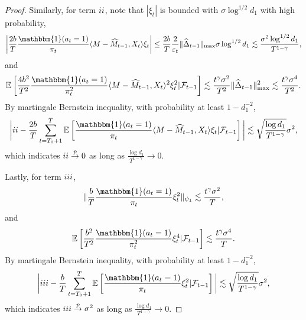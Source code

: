 \documentclass[12pt]{article}
\newcommand{\inp}[2]{\langle #1,#2\rangle}
\def\EE{{\mathbb E}}
\theoremstyle{plain}
\begin{document}
\begin{proof}
    Similarly, for term $\uppercase\expandafter{\romannumeral2}$, note that $|\xi_t|$ is bounded with $\sigma\log^{1/2} d_1$ with high probability, 
    \begin{align*}
        \bigg|\frac{2b}{T} \frac{\mathbbm{1}(a_t=1)}{\pi_t} \inp{M-\widehat{M}_{t-1}}{X_t}\xi_t\bigg|\leq \frac{2b}{T}\frac{2}{\varepsilon_t}\|\widehat{\Delta}_{t-1}\|_{\max}\sigma\log^{1/2} d_1 \lesssim \frac{\sigma^2\log^{1/2} d_1}{T^{1-\gamma}},
    \end{align*}
    and
    \begin{align*}
        \EE\left[\frac{4b^2}{T^2} \frac{\mathbbm{1}(a_t=1)}{\pi_t^2} \inp{M-\widehat{M}_{t-1}}{X_t}^2\xi_t^2|\mathcal{F}_{t-1}\right] \lesssim \frac{t^\gamma\sigma^2}{T^2}\|\widehat{\Delta}_{t-1}\|_{\max}^2 \lesssim  \frac{t^\gamma\sigma^4}{T^2}.
    \end{align*}
    By martingale Bernstein inequality, with probability at least $1-d_1^{-2}$, 
    \begin{align*}
        \bigg|\uppercase\expandafter{\romannumeral2} - \frac{2b}{T} \sum_{t=T_0+1}^{T} \EE\left[\frac{\mathbbm{1}(a_t=1)}{\pi_t}\inp{M-\widehat{M}_{t-1}}{X_t} \xi_t|\mathcal{F}_{t-1}\right]\bigg| \lesssim \sqrt{\frac{\log d_1}{T^{1-\gamma}}}\sigma^2,
    \end{align*}
    which indicates $\uppercase\expandafter{\romannumeral2}\overset{p}{\rightarrow} 0$ as long as $\frac{\log d_1}{T^{1-\gamma}} \rightarrow 0$. 
    
    Lastly, for term $\uppercase\expandafter{\romannumeral3}$,
    \begin{align*}
        \|\frac{b}{T} \frac{\mathbbm{1}(a_t=1)}{\pi_t} \xi_t^2\|_{\psi_1}\lesssim \frac{t^\gamma\sigma^2}{T},
    \end{align*}
    and
    \begin{align*}
        \EE\left[\frac{b^2}{T^2} \frac{\mathbbm{1}(a_t=1)}{\pi_t^2} \xi_t^4|\mathcal{F}_{t-1}\right]  \lesssim  \frac{t^\gamma\sigma^4}{T}.
    \end{align*}
    By martingale Bernstein inequality, with probability at least $1-d_1^{-2}$, 
    \begin{align*}
        \bigg|\uppercase\expandafter{\romannumeral3} - \frac{b}{T} \sum_{t=T_0+1}^{T} \EE\left[\frac{\mathbbm{1}(a_t=1)}{\pi_t} \xi_t^2|\mathcal{F}_{t-1}\right]\bigg| \lesssim \sqrt{\frac{\log d_1}{T^{1-\gamma}}}\sigma^2,
    \end{align*}
    which indicates $\uppercase\expandafter{\romannumeral3}\overset{p}{\rightarrow} \sigma^2$ as long as $\frac{\log d_1}{T^{1-\gamma}} \rightarrow 0$. 
    

\end{proof}
\end{document}
